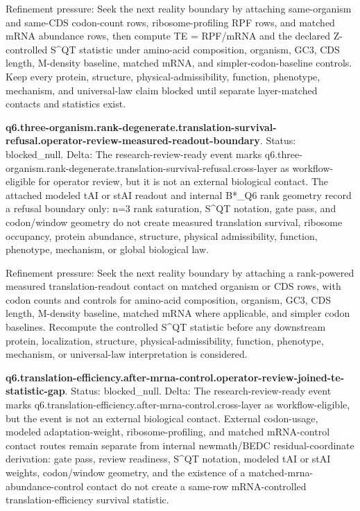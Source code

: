 Refinement pressure: Seek the next reality boundary by attaching same-organism and same-CDS codon-count rows, ribosome-profiling RPF rows, and matched mRNA abundance rows, then compute TE = RPF/mRNA and the declared Z-controlled S\textasciicircum{}QT statistic under amino-acid composition, organism, GC3, CDS length, M-density baseline, matched mRNA, and simpler-codon-baseline controls. Keep every protein, structure, physical-admissibility, function, phenotype, mechanism, and universal-law claim blocked until separate layer-matched contacts and statistics exist.

\textbf{q6.three-organism.rank-degenerate.translation-survival-refusal.operator-review-measured-readout-boundary}. Status: blocked\_null. Delta: The research-review-ready event marks q6.three-organism.rank-degenerate.translation-survival-refusal.cross-layer as workflow-eligible for operator review, but it is not an external biological contact. The attached modeled tAI or stAI readout and internal B*\_Q6 rank geometry record a refusal boundary only: n=3 rank saturation, S\textasciicircum{}QT notation, gate pass, and codon/window geometry do not create measured translation survival, ribosome occupancy, protein abundance, structure, physical admissibility, function, phenotype, mechanism, or global biological law.

Refinement pressure: Seek the next reality boundary by attaching a rank-powered measured translation-readout contact on matched organism or CDS rows, with codon counts and controls for amino-acid composition, organism, GC3, CDS length, M-density baseline, matched mRNA where applicable, and simpler codon baselines. Recompute the controlled S\textasciicircum{}QT statistic before any downstream protein, localization, structure, physical-admissibility, function, phenotype, mechanism, or universal-law interpretation is considered.

\textbf{q6.translation-efficiency.after-mrna-control.operator-review-joined-te-statistic-gap}. Status: blocked\_null. Delta: The research-review-ready event marks q6.translation-efficiency.after-mrna-control.cross-layer as workflow-eligible, but the event is not an external biological contact. External codon-usage, modeled adaptation-weight, ribosome-profiling, and matched mRNA-control contact routes remain separate from internal newmath/BEDC residual-coordinate derivation: gate pass, review readiness, S\textasciicircum{}QT notation, modeled tAI or stAI weights, codon/window geometry, and the existence of a matched-mrna-abundance-control contact do not create a same-row mRNA-controlled translation-efficiency survival statistic.

